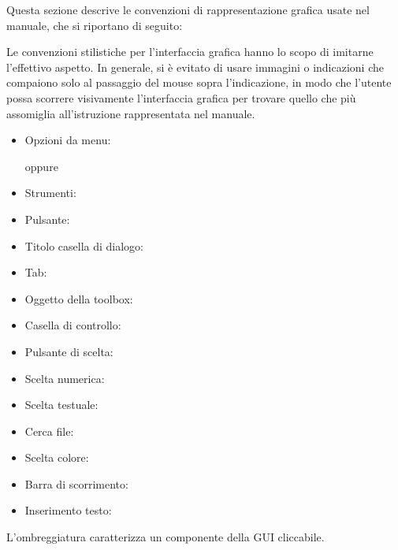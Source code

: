 \label{label_conventions}

Questa sezione descrive le convenzioni di rappresentazione grafica usate nel manuale, che si
riportano di seguito:


Le convenzioni stilistiche per l’interfaccia grafica hanno lo scopo di imitarne l’effettivo aspetto. In
generale, si è evitato di usare immagini o indicazioni che compaiono solo al passaggio del mouse
sopra l’indicazione, in modo che l’utente possa scorrere visivamente l’interfaccia grafica per trovare 
quello che più assomiglia all’istruzione rappresentata nel manuale.

\begin{itemize}[label=--,itemsep=5pt]
\item  Opzioni da menu:  \arrow
{}

oppure

 \arrow
{} \arrow {}
\item Strumenti: 
\item Pulsante: 
\item Titolo casella di dialogo: 
\item Tab: 
\item Oggetto della toolbox: 
\item Casella di controllo: 
\item Pulsante di scelta:   
\item Scelta numerica: 
\item Scelta testuale: 
\item Cerca file: \browsebutton
\item Scelta colore: 
\item Barra di scorrimento: 
\item Inserimento testo: 
\end{itemize}
L’ombreggiatura caratterizza un componente della GUI cliccabile.

